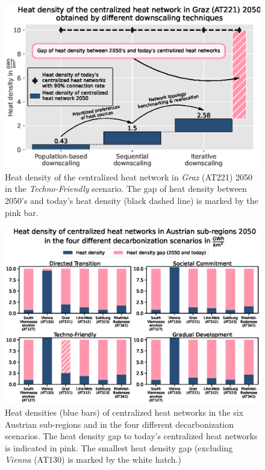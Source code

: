 \begin{figure}[h]
	\centering
	\includegraphics[width=1\linewidth]{figures/4_Results/Fig_Heat-density/HD_cleaned1.eps}
	\caption{Heat density of the centralized heat network in \textit{Graz} (AT221) 2050 in the \textit{Techno-Friendly} scenario. The gap of heat density between 2050's and today's heat density (black dashed line) is marked by the pink bar.}
	\label{fig:res5}
\end{figure}

\begin{figure}[h]
	\centering
	\includegraphics[width=1\linewidth]{figures/4_Results/Fig_Gap/HD1.eps}
	\caption{Heat densities (blue bars) of centralized heat networks in the six Austrian sub-regions and in the four different decarbonization scenarios. The heat density gap to today's centralized heat networks is indicated in pink. The smallest heat density gap (excluding \textit{Vienna} (AT130) is marked by the white hatch.)}
	\label{fig:res4}
\end{figure}